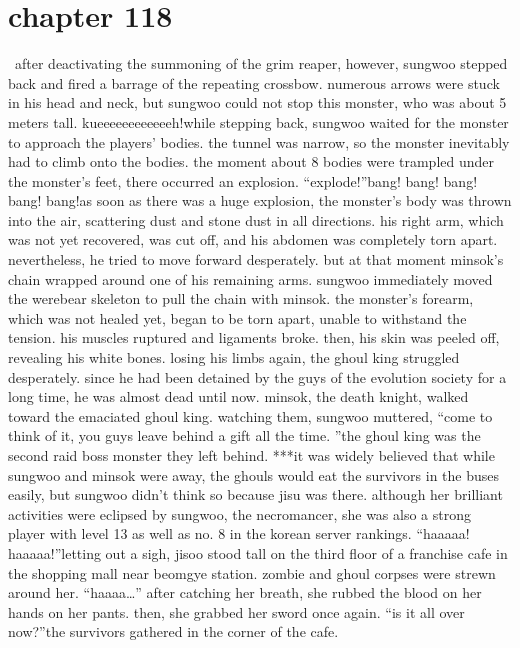 \section{chapter 118}






 after deactivating the summoning of the grim reaper, however, sungwoo stepped back and fired a barrage of the repeating crossbow.
 numerous arrows were stuck in his head and neck, but sungwoo could not stop this monster, who was about 5 meters tall.
kueeeeeeeeeeeeh!while stepping back, sungwoo waited for the monster to approach the players’ bodies.
the tunnel was narrow, so the monster inevitably had to climb onto the bodies.
 the moment about 8 bodies were trampled under the monster’s feet, there occurred an explosion.
“explode!”bang! bang! bang! bang! bang!as soon as there was a huge explosion, the monster’s body was thrown into the air, scattering dust and stone dust in all directions.
his right arm, which was not yet recovered, was cut off, and his abdomen was completely torn apart.
 nevertheless, he tried to move forward desperately.
but at that moment minsok’s chain wrapped around one of his remaining arms.
sungwoo immediately moved the werebear skeleton to pull the chain with minsok.
the monster’s forearm, which was not healed yet, began to be torn apart, unable to withstand the tension.
 his muscles ruptured and ligaments broke.
 then, his skin was peeled off, revealing his white bones.
losing his limbs again, the ghoul king struggled desperately.
 since he had been detained by the guys of the evolution society for a long time, he was almost dead until now.
minsok, the death knight, walked toward the emaciated ghoul king.
watching them, sungwoo muttered, “come to think of it, you guys leave behind a gift all the time.
”the ghoul king was the second raid boss monster they left behind.
***it was widely believed that while sungwoo and minsok were away, the ghouls would eat the survivors in the buses easily, but sungwoo didn’t think so because jisu was there.
although her brilliant activities were eclipsed by sungwoo, the necromancer, she was also a strong player with level 13 as well as no.
 8 in the korean server rankings.
“haaaaa! haaaaa!”letting out a sigh, jisoo stood tall on the third floor of a franchise cafe in the shopping mall near beomgye station.
 zombie and ghoul corpses were strewn around her.
“haaaa…”
after catching her breath, she rubbed the blood on her hands on her pants.
 then, she grabbed her sword once again.
“is it all over now?”the survivors gathered in the corner of the cafe.
